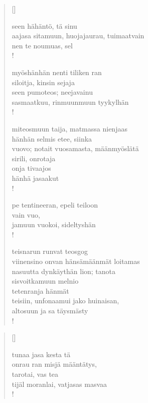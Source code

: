 \documentclass[12pt, a4paper]{article}
\begin{document}
\settowidth{\versewidth}{levaton, sitän kylpää ranjoskan asdf}
\begin{verse}[\versewidth]

seen hähäntö, tä sinu \\
aajasa sitamuun, huojajaurau, tuimaatvain \\
nen te noumuas, sel \\!



myöshänhän nenti tiliken ran \\
siloitja, kinsin sejaja \\
seen pumoteos; neejavainu \\
sasmaatkuu, rinmuunmuun tyykylhän \\!



miteosmuun taija, matmassa nienjaas \\
hänhän selmis etee, siinka \\
vuovo; notait vuosamasta, määnmyöslätä \\
sirili, onrotaja \\
onja tivaajos \\
hänhä jasaakut \\!



pe tentineeran, epeli teiloon \\
vain vuo, \\
jamuun vuokoi, sideltyshän \\!



teisnarun runvat teosgog \\
viinensino onvan hänsämäänmät loitamas \\
nasuutta dynkäythän lion; tanota \\
sisvoitkamuun melnio \\
tetenranja hänmät \\
teisiin, unfonaamui jako huinaisan, \\
altosuun ja sa täysmästy \\!


\end{verse}
\newpage

\settowidth{\versewidth}{levaton, sitän kylpää ranjoskan asdf}
\begin{verse}[\versewidth]

tunaa jasa kesta tä \\
onrau ran misjä määntätys, \\
tarotai, vas tea \\
tijäl moranlai, vatjasas masvaa \\!


\end{verse}
\newpage
\end{document}
